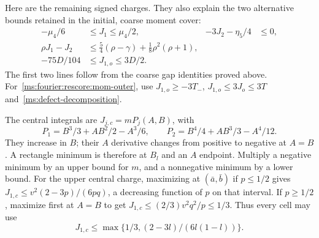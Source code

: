 Here are the remaining signed charges. They also explain the two
alternative bounds retained in the initial, coarse moment cover:
\begin{align}
 -\mu_4/6&\le J_1\le\mu_4/2,&
 -3J_2-\eta_5/4&\le0,                                  \label{ms:fourier:rescore:mom-gap-signs}\\
 \rho J_1-J_2&\le\tfrac54(\rho-\gamma)+\tfrac18\rho^2(\rho+1),
                                                              \label{ms:fourier:rescore:mom-oldgap}\\
 -75D/104&\le J_{1,o}\le3D/2.                           \label{ms:fourier:rescore:mom-outer}
\end{align}
The first two lines follow from the coarse gap identities proved above.
For~\eqref{ms:fourier:rescore:mom-outer}, use $J_{1,o}\ge-3T_-$,
$J_{1,o}\le3J_o\le3T$ and~\eqref{ms:defect-decomposition}.

The central integrals are $J_{j,c}=mP_j(A,B)$, with
\[
 P_1=B^3/3+AB^2/2-A^3/6,\qquad
 P_2=B^4/4+AB^3/3-A^4/12.
\]
They increase in $B$; their $A$ derivative changes from positive to negative
at $A=B$. A rectangle minimum is therefore at $B_l$ and an $A$ endpoint.
Multiply a negative minimum by an upper bound for $m$, and a nonnegative
minimum by a lower bound. For the upper central charge, maximizing at
$(\bar a,\bar b)$ if $p\le1/2$ gives
$J_{1,c}\le v^2(2-3p)/(6pq)$, a decreasing function of $p$ on that interval.
If $p\ge1/2$, maximize first at $A=B$ to get
$J_{1,c}\le(2/3)v^2q^2/p\le1/3$. Thus every cell may use
\begin{equation}\label{ms:fourier:rescore:mom-central-upper}
 J_{1,c}\le\max\{1/3,(2-3l)/(6l(1-l))\}.
\end{equation}


